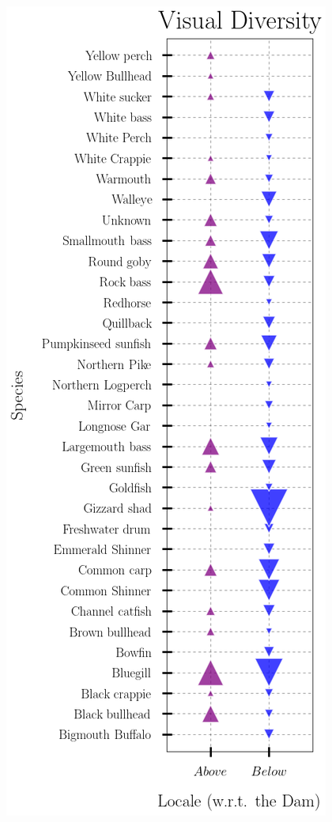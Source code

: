 \documentclass[b0paper,margin=1cm,landscape]{baposter}
\begin{document}
\begin{poster}
{  \hspace{5mm}
  \includegraphics[width=.8\textwidth]{Img/Diversity_Bubble_Plot.png}

}

\end{poster}
\end{document}
